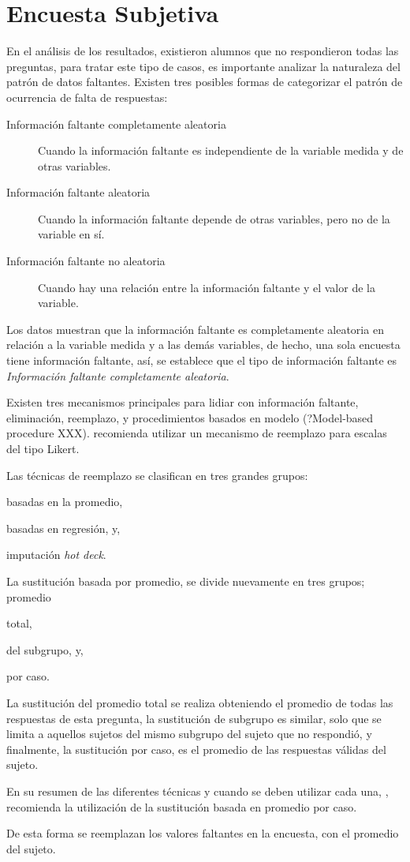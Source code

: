 \section{Encuesta Subjetiva}

En el análisis de los resultados, existieron alumnos que no respondieron todas
las preguntas, para tratar este tipo de casos, es importante analizar la
naturaleza del patrón de datos faltantes\cite{carpita2011imputation}. Existen
tres posibles formas de categorizar el patrón de ocurrencia de falta de
respuestas\cite{leite2010performance,tsikriktsis2005review}:


\begin{description}
    \item[Información faltante completamente aleatoria] Cuando la información
        faltante es independiente de la variable medida y de otras variables.
    \item[Información faltante aleatoria] Cuando la información faltante depende
        de otras variables, pero no de la variable en sí. 
    \item[Información faltante no aleatoria] Cuando hay una relación entre la
        información faltante y el valor de la variable.
\end{description}

Los datos muestran que la información faltante es completamente aleatoria en
relación a la variable medida y a las demás variables, de hecho, una sola
encuesta tiene información faltante, así, se establece que el tipo de
información faltante es \emph{Información faltante completamente aleatoria}.

Existen tres mecanismos\cite{tsikriktsis2005review} principales para lidiar con
información faltante, eliminación, reemplazo, y procedimientos basados en modelo
(?Model-based procedure XXX).\cite{tsikriktsis2005review} recomienda utilizar
un mecanismo de reemplazo para escalas del tipo Likert.

Las técnicas de reemplazo se clasifican en tres grandes
grupos\cite{tsikriktsis2005review}:
\begin{enumerate*}[label=\itshape\alph*\upshape.]
\item basadas en la promedio,
\item basadas en regresión, y,
\item imputación \emph{hot deck}.
\end{enumerate*}

La sustitución basada por promedio, se divide nuevamente en tres grupos;
promedio
\begin{enumerate*}[label=\itshape\alph*\upshape.]
\item total,
\item del subgrupo, y,
\item por caso.
\end{enumerate*}
La sustitución del promedio total se realiza obteniendo el promedio de todas las
respuestas de esta pregunta, la sustitución de subgrupo es similar, solo que se
limita a aquellos sujetos del mismo subgrupo del sujeto que no respondió, y
finalmente, la sustitución por caso, es el promedio de las respuestas válidas
del sujeto.

En su resumen de las diferentes técnicas y cuando se deben utilizar cada una,
\cite{tsikriktsis2005review}, recomienda la utilización de la sustitución basada
en promedio por caso. 

De esta forma se reemplazan los valores faltantes en la encuesta, con el
promedio del sujeto.
